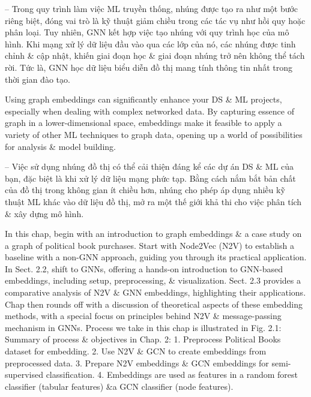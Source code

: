 \documentclass{article}
\begin{document}
\begin{itemize}
    -- Trong quy trình làm việc ML truyền thống, nhúng được tạo ra như một bước riêng biệt, đóng vai trò là kỹ thuật giảm chiều trong các tác vụ như hồi quy hoặc phân loại. Tuy nhiên, GNN kết hợp việc tạo nhúng với quy trình học của mô hình. Khi mạng xử lý dữ liệu đầu vào qua các lớp của nó, các nhúng được tinh chỉnh \& cập nhật, khiến giai đoạn học \& giai đoạn nhúng trở nên không thể tách rời. Tức là, GNN học dữ liệu biểu diễn đồ thị mang tính thông tin nhất trong thời gian đào tạo.

    Using graph embeddings can significantly enhance your DS \& ML projects, especially when dealing with complex networked data. By capturing essence of graph in a lower-dimensional space, embeddings make it feasible to apply a variety of other ML techniques to graph data, opening up a world of possibilities for analysis \& model building.

    -- Việc sử dụng nhúng đồ thị có thể cải thiện đáng kể các dự án DS \& ML của bạn, đặc biệt là khi xử lý dữ liệu mạng phức tạp. Bằng cách nắm bắt bản chất của đồ thị trong không gian ít chiều hơn, nhúng cho phép áp dụng nhiều kỹ thuật ML khác vào dữ liệu đồ thị, mở ra một thế giới khả thi cho việc phân tích \& xây dựng mô hình.

    In this chap, begin with an introduction to graph embeddings \& a case study on a graph of political book purchases. Start with Node2Vec (N2V) to establish a baseline with a non-GNN approach, guiding you through its practical application. In Sect. 2.2, shift to GNNs, offering a hands-on introduction to GNN-based embeddings, including setup, preprocessing, \& visualization. Sect. 2.3 provides a comparative analysis of N2V \& GNN embeddings, highlighting their applications. Chap then rounds off with a discussion of theoretical aspects of these embedding methods, with a special focus on principles behind N2V \& message-passing mechanism in GNNs. Process we take in this chap is illustrated in {\sf Fig. 2.1: Summary of process \& objectives in Chap. 2: 1. Preprocess Political Books dataset for embedding. 2. Use N2V \& GCN to create embeddings from preprocessed data. 3. Prepare N2V embeddings \& GCN embeddings for semi-supervised classification. 4. Embeddings are used as features in a random forest classifier (tabular features) \&a GCN classifier (node features).}


\end{itemize}
\end{document}
